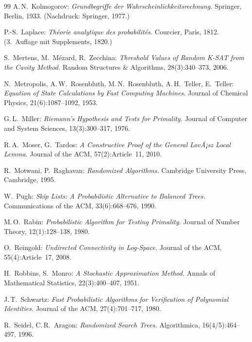 ﻿\documentclass[12pt,a4paper]{article}
\theoremstyle{definition}
\theoremstyle{plain}
\theoremstyle{remark}
\begin{document}
\begin{thebibliography}{99}
A.\,N.\ Kolmogorov:
\textit{Grundbegriffe der Wahrscheinlichkeitsrechnung.}
Springer, Berlin, 1933.
(Nachdruck: Springer, 1977.)

P.-S.\ Laplace:
\textit{Théorie analytique des probabilités.}
Courcier, Paris, 1812.
(3.~Auflage mit Supplements, 1820.)

S.\ Mertens, M.\ Mézard, R.\ Zecchina:
\textit{Threshold Values of Random K-SAT from the Cavity Method.}
Random Structures \& Algorithms, 28(3):340--373, 2006.

N.\ Metropolis, A.\,W.\ Rosenbluth, M.\,N.\ Rosenbluth, A.\,H.\ Teller, E.\ Teller:
\textit{Equation of State Calculations by Fast Computing Machines.}
Journal of Chemical Physics, 21(6):1087--1092, 1953.

G.\,L.\ Miller:
\textit{Riemann's Hypothesis and Tests for Primality.}
Journal of Computer and System Sciences, 13(3):300--317, 1976.

R.\,A.\ Moser, G.\ Tardos:
\textit{A Constructive Proof of the General LovÃ¡sz Local Lemma.}
Journal of the ACM, 57(2):Article~11, 2010.

R.\ Motwani, P.\ Raghavan:
\textit{Randomized Algorithms.}
Cambridge University Press, Cambridge, 1995.

W.\ Pugh:
\textit{Skip Lists: A Probabilistic Alternative to Balanced Trees.}
Communications of the ACM, 33(6):668--676, 1990.

M.\,O.\ Rabin:
\textit{Probabilistic Algorithm for Testing Primality.}
Journal of Number Theory, 12(1):128--138, 1980.

O.\ Reingold:
\textit{Undirected Connectivity in Log-Space.}
Journal of the ACM, 55(4):Article~17, 2008.

H.\ Robbins, S.\ Monro:
\textit{A Stochastic Approximation Method.}
Annals of Mathematical Statistics, 22(3):400--407, 1951.

J.\,T.\ Schwartz:
\textit{Fast Probabilistic Algorithms for Verification of Polynomial Identities.}
Journal of the ACM, 27(4):701--717, 1980.

R.\ Seidel, C.\,R.\ Aragon:
\textit{Randomized Search Trees.}
Algorithmica, 16(4/5):464--497, 1996.


\end{thebibliography}
\end{document}
